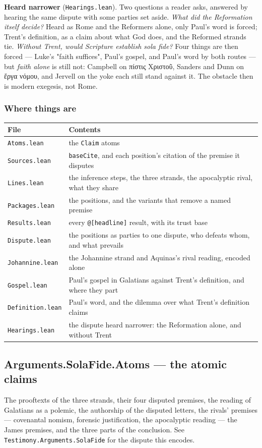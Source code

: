 \documentclass[11pt]{article}
\begin{document}
\textbf{Heard narrower} (\texttt{Hearings.lean}). Two questions a reader asks, answered by hearing the same dispute with some parties set aside. \emph{What did the Reformation itself decide?} Heard as Rome and the Reformers alone, only Paul's word is forced; Trent's definition, as a claim about what God does, and the Reformed strands tie. \emph{Without Trent, would Scripture establish sola fide?} Four things are then forced — Luke's "faith suffices", Paul's gospel, and Paul's word by both routes — but \emph{faith alone} is still not: Campbell on πίστις Χριστοῦ, Sanders and Dunn on ἔργα νόμου, and Jervell on the yoke each still stand against it. The obstacle then is modern exegesis, not Rome.

\subsubsection*{Where things are}
\begin{longtable}{@{}>{\raggedright\arraybackslash}p{} >{\raggedright\arraybackslash}p{}@{}}
\toprule
\textbf{File} & \textbf{Contents} \\
\midrule
\endhead
\texttt{Atoms.lean} & the \texttt{Claim} atoms \\
\texttt{Sources.lean} & \texttt{base\allowbreak{}Cite}, and each position's citation of the premise it disputes \\
\texttt{Lines.lean} & the inference steps, the three strands, the apocalyptic rival, what they share \\
\texttt{Packages.lean} & the positions, and the variants that remove a named premise \\
\texttt{Results.lean} & every \texttt{@[headline]} result, with its trust base \\
\texttt{Dispute.lean} & the positions as parties to one dispute, who defeats whom, and what prevails \\
\texttt{Johannine.lean} & the Johannine strand and Aquinas's rival reading, encoded alone \\
\texttt{Gospel.lean} & Paul's gospel in Galatians against Trent's definition, and where they part \\
\texttt{Definition.lean} & Paul's word, and the dilemma over what Trent's definition claims \\
\texttt{Hearings.lean} & the dispute heard narrower: the Reformation alone, and without Trent \\
\bottomrule
\end{longtable}
\subsection*{Arguments.SolaFide.Atoms — the atomic claims}
The prooftexts of the three strands, their four disputed premises, the reading of Galatians as a polemic, the authorship of the disputed letters, the rivals' premises — covenantal nomism, forensic justification, the apocalyptic reading — the James premises, and the three parts of the conclusion. See \texttt{Testimony.Arguments.Sola\allowbreak{}Fide} for the dispute this encodes.
\end{document}
